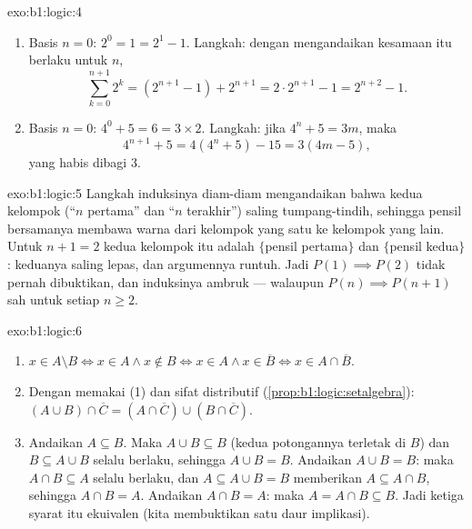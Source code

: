 \begin{solution}{exo:b1:logic:4}
\begin{enumerate}
  \item Basis $n = 0$: $2^0 = 1 = 2^1 - 1$. Langkah: dengan
        mengandaikan kesamaan itu berlaku untuk $n$,
        \[
        \sum_{k=0}^{n+1} 2^k = (2^{n+1} - 1) + 2^{n+1}
        = 2 \cdot 2^{n+1} - 1 = 2^{n+2} - 1 .
        \]
  \item Basis $n = 0$: $4^0 + 5 = 6 = 3 \times 2$. Langkah: jika
        $4^n + 5 = 3m$, maka
        \[
        4^{n+1} + 5 = 4(4^n + 5) - 15 = 3(4m - 5),
        \]
        yang habis dibagi $3$.
\end{enumerate}
\end{solution}

\begin{solution}{exo:b1:logic:5}
Langkah induksinya diam-diam mengandaikan bahwa kedua kelompok
(``$n$ pertama'' dan ``$n$ terakhir'') saling tumpang-tindih, sehingga
pensil bersamanya membawa warna dari kelompok yang satu ke kelompok
yang lain. Untuk $n + 1 = 2$ kedua kelompok itu adalah
$\{$pensil pertama$\}$ dan $\{$pensil kedua$\}$: keduanya saling lepas,
dan argumennya runtuh. Jadi $P(1) \implies P(2)$ tidak pernah
dibuktikan, dan induksinya ambruk --- walaupun $P(n) \implies P(n+1)$
sah untuk setiap $n \geq 2$.
\end{solution}

\begin{solution}{exo:b1:logic:6}
\begin{enumerate}
  \item $x \in A \setminus B \iff x \in A \land x \notin B \iff x \in
        A \land x \in \overline{B} \iff x \in A \cap \overline{B}$.
  \item Dengan memakai (1) dan sifat distributif
        (\cref{prop:b1:logic:setalgebra}):
        $(A \cup B) \cap \overline{C} = (A \cap \overline{C}) \cup
        (B \cap \overline{C})$.
  \item Andaikan $A \subseteq B$. Maka $A \cup B \subseteq B$ (kedua
        potongannya terletak di $B$) dan $B \subseteq A \cup B$ selalu
        berlaku, sehingga $A \cup B = B$. Andaikan $A \cup B = B$: maka
        $A \cap B
        \subseteq A$ selalu berlaku, dan $A \subseteq A \cup B = B$
        memberikan $A \subseteq A \cap B$, sehingga $A \cap B = A$.
        Andaikan $A \cap B =
        A$: maka $A = A \cap B \subseteq B$. Jadi ketiga syarat itu
        ekuivalen (kita membuktikan satu daur implikasi).
\end{enumerate}
\end{solution}


